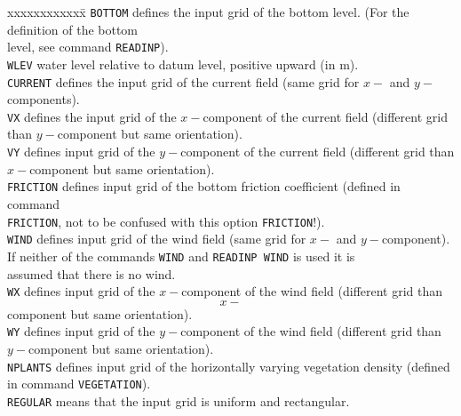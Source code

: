 \documentclass[12pt]{book}
\begin{document}
\begin{tabbing}
xxxxxxxxxxxx\= \kill
{\tt BOTTOM}        \> defines the input grid of the bottom level. (For the definition of the bottom\+\\
                       level, see command {\tt READINP}).\-\\
{\tt WLEV}          \> water level relative to datum level, positive upward (in m).\\
{\tt CURRENT}       \> defines the input grid of the current field (same grid for $x-$ and $y-$components).\\
{\tt VX}            \> defines the input grid of the $x-$component of the current field (different grid\+\\
                       than $y-$component but same orientation).\-\\
{\tt VY}            \> defines input grid of the $y-$component of the current field (different grid than\+\\
                       $x-$component but same orientation).\-\\
{\tt FRICTION}      \> defines input grid of the bottom friction coefficient (defined in command\+\\
                       {\tt FRICTION}, not to be confused with this option {\tt FRICTION}!).\-\\
{\tt WIND}          \> defines input grid of the wind field (same grid for $x-$ and $y-$component).\+\\
                       If neither of the commands {\tt WIND} and {\tt READINP WIND} is used it is\\
                       assumed that there is no wind.\-\\
{\tt WX}            \> defines input grid of the $x-$component of the wind field (different grid than\+\\
                       $$x-$$component but same orientation).\-\\
{\tt WY}            \> defines input grid of the $y-$component of the wind field (different grid than\+\\
                       $y-$component but same orientation).\-\\
{\tt NPLANTS}       \> defines input grid of the horizontally varying vegetation density (defined\+\\
                       in command {\tt VEGETATION}).\-\\
{\tt REGULAR}       \> means that the input grid is uniform and rectangular.\\

\end{tabbing}
\end{document}
